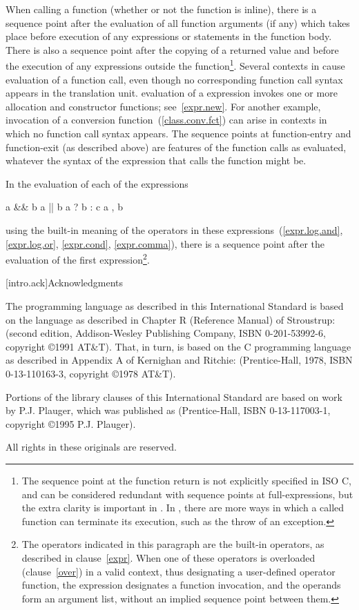 \pnum
When calling a function (whether or not the function is inline), there is a
sequence point after the evaluation of all function arguments (if any)
which takes place before execution of any expressions or statements in
the function body.  There is also a sequence point after the copying of a
returned value and before the execution of any expressions outside
the function\footnote{The sequence point at the function return is not
explicitly specified in ISO C, and can be considered redundant with
sequence points at full-expressions, but the extra clarity is important
in \Cpp. In \Cpp, there are more ways in which a called function can terminate
its execution, such as the throw of an exception.}.
Several contexts in \Cpp  cause evaluation of a function call, even
though no corresponding function call syntax appears in the translation
unit.
\enterexample
evaluation of a  expression invokes one or more allocation
and constructor functions; see~\ref{expr.new}. For another example,
invocation of a conversion function~(\ref{class.conv.fct}) can arise in
contexts in which no function call syntax appears.
\exitexample
The sequence points at function-entry and function-exit (as
described above) are features of the function calls as evaluated,
whatever the syntax of the expression that calls the function might be.%

\pnum
In the evaluation of each of the expressions
\begin{codeblock}
a && b
a || b
a ? b : c
a , b
\end{codeblock}
using the built-in meaning of the operators in these
expressions~(\ref{expr.log.and}, \ref{expr.log.or}, \ref{expr.cond},
\ref{expr.comma}),
there is a sequence point after the evaluation of the first
expression\footnote{The operators indicated in this paragraph are the
built-in operators, as described in clause~\ref{expr}. When one of these
operators is overloaded (clause~\ref{over}) in a valid context, thus
designating a user-defined operator function, the expression designates a
function invocation, and the operands form an argument list, without an
implied sequence point between them.}.


[intro.ack]{Acknowledgments}

\pnum
The \Cpp  programming language as described in this International
Standard is based on the language as described in Chapter R (Reference
Manual) of Stroustrup:  (second
edition, Addison-Wesley Publishing Company, ISBN 0-201-53992-6,
copyright \copyright 1991 AT\&T). That, in turn, is based on the C
programming language as described in Appendix A of Kernighan and
Ritchie:  (Prentice-Hall, 1978, ISBN
0-13-110163-3, copyright \copyright 1978 AT\&T).

\pnum
Portions of the library clauses of this International Standard are based
on work by P.J. Plauger, which was published as  (Prentice-Hall, ISBN 0-13-117003-1, copyright
\copyright 1995 P.J. Plauger).

\pnum
All rights in these originals are reserved.
